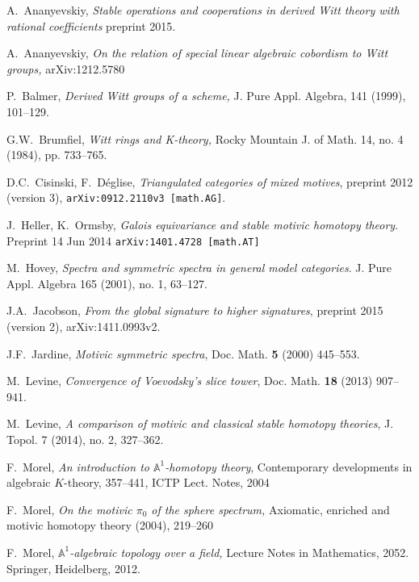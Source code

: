 \documentclass[a4paper,12pt,draft]{amsart}
\theoremstyle{definition}
\theoremstyle{remark}
\begin{document}
\begin{thebibliography}{XXXX}

A.~Ananyevskiy,
\emph{Stable operations and cooperations in derived Witt theory with rational coefficients} preprint 2015.

A.~Ananyevskiy,
\emph{On the relation of special linear algebraic cobordism to Witt groups,}
arXiv:1212.5780 

P.~Balmer,
\emph{Derived Witt groups of a scheme,}
J. Pure Appl. Algebra, 141 (1999), 101--129.

G.W.~Brumfiel,
\emph{Witt rings and K-theory,}
Rocky Mountain J. of Math. 14, no. 4 (1984), pp. 733--765.

 D.C.~Cisinski,  F.~D\'eglise,
 \emph{Triangulated categories of mixed motives}, preprint 2012 (version 3), 
\verb!arXiv:0912.2110v3 [math.AG]!.

J.~Heller, K.~Ormsby,
\emph{Galois equivariance and stable motivic homotopy theory}.
Preprint 14 Jun 2014 \verb!arXiv:1401.4728 [math.AT]!

M.~Hovey,   \emph{Spectra and symmetric spectra in general model categories}. J. Pure Appl. Algebra 165 (2001), no. 1, 63--127. 

J.A.~Jacobson,
\emph{From the global signature to higher signatures}, preprint 2015 (version 2), 
arXiv:1411.0993v2.

J.F.~Jardine,  {\sl Motivic symmetric spectra},
{Doc. Math.} {\bf 5} (2000) 445--553.

M.~Levine, 
\emph{Convergence of Voevodsky's slice tower}, Doc. Math. {\bf 18} (2013) 907--941.

M.~Levine,
\emph{A comparison of motivic and classical stable homotopy theories}, 
J. Topol. 7 (2014), no. 2, 327--362.

F.~Morel,
\emph{An introduction to ${{\mathbb A}}^1$-homotopy theory}, 
Contemporary developments in algebraic $K$-theory, 357--441, 
ICTP Lect. Notes, 2004

F.~Morel,
\emph{On the motivic $\pi_0$ of the sphere spectrum,}
Axiomatic, enriched and motivic homotopy theory (2004), 219--260

F.~Morel,
\emph{${{\mathbb A}}^1$-algebraic topology over a field,}
 Lecture Notes in Mathematics, 2052. Springer, Heidelberg, 2012.


\end{thebibliography}
\end{document}
